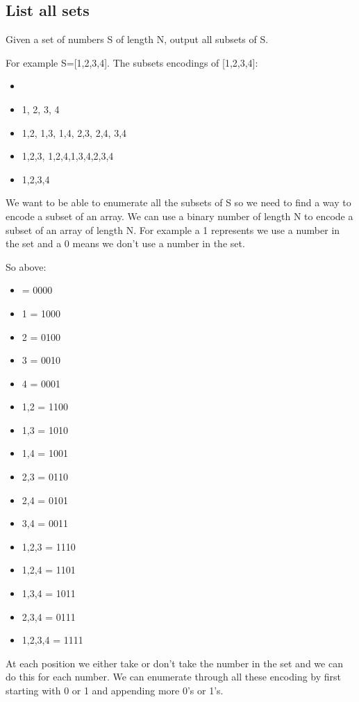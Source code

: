 \documentclass[11pt,oneside]{book}
\begin{document}
\subsection{List all sets}

Given a set of numbers S of length N, output all subsets of S.

For example S=[1,2,3,4]. The subsets encodings of [1,2,3,4]:

\begin{itemize}
\item {}
\item {1}, {2}, {3}, {4}
\item {1,2}, {1,3}, {1,4}, {2,3}, {2,4}, {3,4}
\item {1,2,3}, {1,2,4},{1,3,4},{2,3,4}
\item {1,2,3,4}
\end{itemize}

We want to be able to enumerate all the subsets of S so we need to find a way to encode a subset of an array. We can use a binary number of length N to encode a subset of an array of length N. For example a 1 represents we use a number in the set and a 0 means we don't use a number in the set.

So above:

\begin{itemize}
\item {} = 0000
\item {1} = 1000
\item {2} = 0100
\item {3} = 0010
\item {4} = 0001
\item {1,2} = 1100
\item {1,3} = 1010
\item {1,4} = 1001
\item {2,3} = 0110
\item {2,4} = 0101
\item {3,4} = 0011
\item {1,2,3} = 1110
\item {1,2,4} = 1101
\item {1,3,4} = 1011
\item {2,3,4} = 0111
\item {1,2,3,4} = 1111
\end{itemize}

At each position we either take or don't take the number in the set and we can do this for each number. We can enumerate through all these encoding by first starting with 0 or 1 and appending more 0's or 1's.
\end{document}
